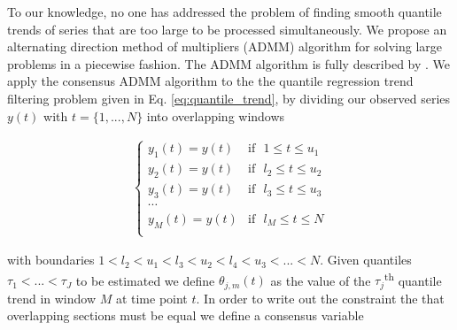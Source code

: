 \documentclass[12pt]{article}
\begin{document}
	To our knowledge, no one has addressed the problem of finding smooth quantile trends of series that are too large to be processed simultaneously. We propose an alternating direction method of multipliers (ADMM) algorithm for solving large problems in a piecewise fashion. The ADMM algorithm is fully described by \cite{boyd2011distributed, gabay1975dual, glowinski1975approximation}. We apply the consensus ADMM algorithm to the the quantile regression trend filtering problem given in Eq. \ref{eq:quantile_trend}, by dividing our observed series $y(t)$ with $t = \{1, ..., N\}$ into overlapping windows 
	
	\begin{align*}
	\begin{cases}
	y_1(t) = y(t) & \mbox{if~~} 1 \le t \le u_{1}\\
	y_2(t) = y(t) & \mbox{if~~} l_{2} \le t \le u_{2} \\
	y_3(t) = y(t) & \mbox{if~~} l_{3} \le t \le u_{3} \\
	\cdots & \\
	y_M(t) = y(t) & \mbox{if~~} l_{M} \le t \le  N\\
	\end{cases}
	\end{align*}

	 with boundaries $1 < l_{2} < u_{1} < l_{3} < u_{2} < l_{4} < u_{3} < ...< N$. Given quantiles $\tau_1 < ... < \tau_J$ to be estimated we define $\theta_{j,m}(t)$ as the value of the $\tau_j$\textsuperscript{th} quantile trend in window $M$ at time point $t$. In order to write out the constraint the that overlapping sections must be equal we define a consensus variable
	 
\end{document}
